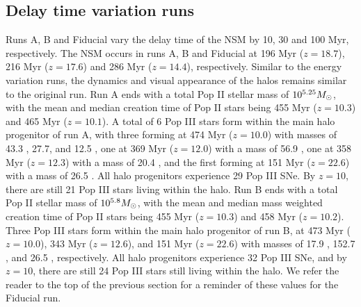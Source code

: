\documentclass[fleqn,usenatbib]{mnras}
\begin{document}
\subsection{Delay time variation runs} \label{sec:time_vary}

Runs A, B and Fiducial vary the delay time of the NSM by 10, 30 and 100 Myr, respectively. The NSM occurs in runs A, B and Fiducial at 196 Myr ($z = 18.7$), 216 Myr ($z = 17.6$) and 286 Myr ($z = 14.4$), respectively. Similar to the energy variation runs, the dynamics and visual appearance of the halos remains similar to the original run. Run A ends with a total Pop II stellar mass of $10^{5.25} \Ms$, with the mean and median creation time of Pop II stars being 455 Myr ($z = 10.3$) and 465 Myr ($z = 10.1$). A total of 6 Pop III stars form within the main halo progenitor of run A, with three forming at 474 Myr ($z = 10.0$) with masses of 43.3 \Ms{}, 27.7\Ms{}, and 12.5 \Ms{}, one at 369 Myr ($z = 12.0$) with a mass of 56.9 \Ms, one at 358 Myr ($z = 12.3$) with a mass of 20.4 \Ms{}, and the first forming at 151 Myr ($z = 22.6$) with a mass of 26.5 \Ms. All halo progenitors experience 29 Pop III SNe. By $z = 10$, there are still 21 Pop III stars living within the halo. Run B ends with a total Pop II stellar mass of $10^{5.8} \Ms$, with the mean and median mass weighted creation time of Pop II stars being 455 Myr ($z = 10.3$) and 458 Myr ($z = 10.2$). Three Pop III stars form within the main halo progenitor of run B, at 473 Myr ($z = 10.0$), 343 Myr ($z = 12.6$), and 151 Myr ($z = 22.6$) with masses of 17.9 \Ms{}, 152.7 \Ms{}, and 26.5 \Ms{}, respectively. All halo progenitors experience 32 Pop III SNe, and by $z = 10$, there are still 24 Pop III stars still living within the halo. We refer the reader to the top of the previous section for a reminder of these values for the Fiducial run. 
\end{document}
